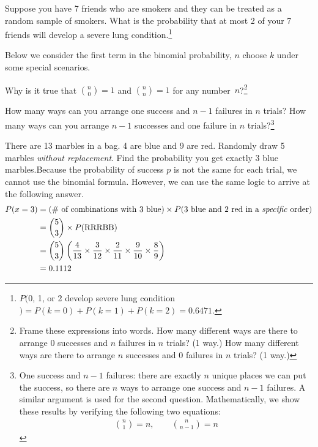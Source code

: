 \begin{exercise}
Suppose you have 7 friends who are smokers and they can be treated as a random sample of smokers. What is the probability that at most 2 of your 7 friends will develop a severe lung condition.\footnote{$P($0, 1, or 2 develop severe lung condition$) = P(k=0) + P(k=1)+P(k=2) = 0.6471$.}
\end{exercise}

Below we consider the first term in the binomial probability, $n$ choose $k$ under some special scenarios.

\begin{exercise}
Why is it true that ${n \choose 0}=1$ and ${n \choose n}=1$ for any \mbox{number~$n$}?\footnote{Frame these expressions into words. How many different ways are there to arrange 0 successes and $n$ failures in $n$ trials? (1 way.) How many different ways are there to arrange $n$ successes and 0 failures in $n$ trials? (1 way.)}
\end{exercise}

\begin{exercise}
How many ways can you arrange one success and $n-1$ failures in $n$ trials? How many ways can you arrange $n-1$ successes and one failure in $n$ trials?\footnote{One success and $n-1$ failures: there are exactly $n$ unique places we can put the success, so there are $n$ ways to arrange one success and $n-1$ failures. A similar argument is used for the second question. Mathematically, we show these results by verifying the following two equations:
\begin{eqnarray*}
{n \choose 1} = n, \qquad {n \choose n-1} = n
\end{eqnarray*}}
\end{exercise}

\begin{example}{There are 13 marbles in a bag.  4 are blue and 9 are red.  Randomly draw 5 marbles \emph{without replacement}.  Find the probability you get exactly 3 blue marbles.}Because the probability of success $p$ is not the same for each trial, we cannot use the binomial formula.  However, we can use the same logic to arrive at the following answer.  
\begin{align*}
P(x = 3) &= (\text{\# of combinations with 3 blue})\times P(\text{3 blue and 2 red in a \emph{specific} order}) \\
&={5\choose 3}\times P(\text{RRRBB}) \\
&= {5\choose 3}\left(\frac{4}{13}\times \frac{3}{12}\times \frac{2}{11} \times \frac{9}{10} \times \frac{8}{9}\right) \\
&= 0.1112
\end{align*}
\end{example}


